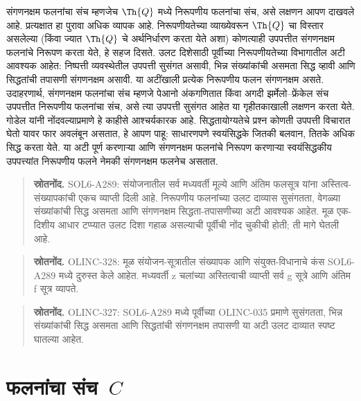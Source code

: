 \begin{explain}
संगणनक्षम फलनांचा संच म्हणजेच $\Th{Q}$ मध्ये निरूपणीय
फलनांचा संच, असे लक्षणन आपण दाखवले आहे. प्रत्यक्षात हा
पुरावा अधिक व्यापक आहे. निरूपणीयतेच्या व्याख्येवरून
$\Th{Q}$ चा विस्तार असलेल्या (किंवा ज्यात $\Th{Q}$ चे
अर्थनिर्धारण करता येते अशा) कोणत्याही उपपत्तीत
संगणनक्षम फलनांचे निरूपण करता येते, हे सहज दिसते.
उलट दिशेसाठी पूर्वीच्या निरूपणीयतेच्या विभागातील अटी
आवश्यक आहेत: निष्पत्ती व्यवस्थेतील उपपत्ती सुसंगत
असावी, भिन्न संख्यांकांची असमता सिद्ध व्हावी आणि
सिद्धतांची तपासणी संगणनक्षम असावी. या अटींखाली
प्रत्येक निरूपणीय फलन संगणनक्षम असते. उदाहरणार्थ, संगणनक्षम फलनांचा संच
म्हणजे पेआनो अंकगणितात किंवा अगदी झर्मेलो--फ्रेंकेल संच
उपपत्तीत निरूपणीय फलनांचा संच, असे त्या उपपत्ती सुसंगत
आहेत या गृहीतकाखाली लक्षणन करता येते.
गोडेल यांनी नोंदवल्याप्रमाणे हे काहीसे आश्चर्यकारक आहे.
सिद्धतायोग्यतेचे प्रश्न कोणती उपपत्ती विचारात घेतो यावर
फार अवलंबून असतात, हे आपण पाहू: साधारणपणे स्वयंसिद्धके
जितकी बलवान, तितके अधिक सिद्ध करता येते. या अटी पूर्ण करणाऱ्या आणि संगणनक्षम फलनांचे निरूपण
करणाऱ्या स्वयंसिद्धकीय उपपत्त्यांत निरूपणीय फलने
नेमकी संगणनक्षम फलनेच असतात.

\end{explain}



\begin{quote}\small\textbf{स्रोतनोंद.} SOL6-A289: संयोजनातील सर्व मध्यवर्ती मूल्ये आणि अंतिम फलसूत्र यांना अस्तित्व-संख्यापकांची एकच व्याप्ती दिली आहे. निरूपणीय फलनांच्या उलट दाव्यास सुसंगतता, वेगळ्या संख्यांकांची सिद्ध असमता आणि संगणनक्षम सिद्धता-तपासणीच्या अटी आवश्यक आहेत. मूळ एक-दिशीय आधार टप्प्यात उलट दिशा गहाळ असल्याची पूर्वीची नोंद चुकीची होती; ती मागे घेतली आहे.\end{quote}
\begin{quote}\small\textbf{स्रोतनोंद.} OLINC-328: मूळ संयोजन-सूत्रातील संख्यापक आणि संयुक्त-विधानाचे कंस SOL6-A289 मध्ये दुरुस्त केले आहेत. मध्यवर्ती z चलांच्या अस्तित्वाची व्याप्ती सर्व g सूत्रे आणि अंतिम f सूत्र व्यापते.\end{quote}
\begin{quote}\small\textbf{स्रोतनोंद.} OLINC-327: SOL6-A289 मध्ये पूर्वीच्या OLINC-035 प्रमाणे सुसंगतता, भिन्न संख्यांकांची सिद्ध असमता आणि सिद्धतांची संगणनक्षम तपासणी या अटी उलट दाव्यात स्पष्ट घातल्या आहेत.\end{quote}









\section{फलनांचा संच~$C$}\label{inc:req:cee:sec}

